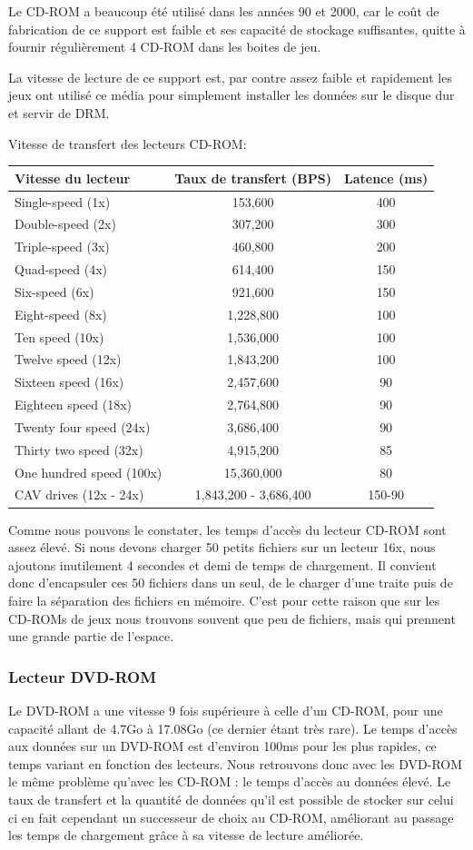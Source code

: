 \documentclass[a4paper, 11pt]{article} %
\begin{document}
Le CD-ROM a beaucoup été utilisé dans les années 90 et 2000, car le coût de fabrication de ce support est faible et ses capacité de stockage suffisantes, quitte à fournir régulièrement 4 CD-ROM dans les boites de jeu.

La vitesse de lecture de ce support est, par contre assez faible et rapidement les jeux ont utilisé ce média pour simplement installer les données sur le disque dur et servir de DRM.

\newpage
Vitesse de transfert des lecteurs CD-ROM: \cite{hardware:cdromspeed}

\begin{tabular}{|l|c|c|}
  \hline
  Vitesse du lecteur & Taux de transfert (BPS) & Latence (ms)\\
  \hline
  Single-speed (1x)&153,600&400\\
	Double-speed (2x)&307,200&300\\
	Triple-speed (3x)&460,800&200\\
	Quad-speed (4x)&614,400&150\\
	Six-speed (6x)&921,600&150\\
	Eight-speed (8x)&1,228,800&100\\
	Ten speed (10x)&1,536,000&100\\
	Twelve speed (12x)&1,843,200&100\\
	Sixteen speed (16x)&2,457,600&90\\
	Eighteen speed (18x)&2,764,800&90\\
	Twenty four speed (24x)&3,686,400&90\\
	Thirty two speed (32x)&4,915,200&85\\
	One hundred speed (100x)&15,360,000&80\\
	CAV drives (12x - 24x)&1,843,200 - 3,686,400&150-90\\
  \hline
\end{tabular}

Comme nous pouvons le constater, les temps d'accès du lecteur CD-ROM sont assez élevé. Si nous devons charger 50 petits fichiers sur un lecteur 16x, nous ajoutons inutilement 4 secondes et demi de temps de chargement. Il convient donc d'encapsuler ces 50 fichiers dans un seul, de le charger d'une traite puis de faire la séparation des fichiers en mémoire.
C'est pour cette raison que sur les CD-ROMs de jeux nous trouvons souvent que peu de fichiers, mais qui prennent une grande partie de l'espace.

\subsubsection{Lecteur DVD-ROM}
Le DVD-ROM a une vitesse 9 fois supérieure à celle d'un CD-ROM,\cite{hardware:dvdromspeed} pour une capacité allant de 4.7Go à 17.08Go (ce dernier étant très rare). Le temps d'accès aux données sur un DVD-ROM est d'environ 100ms pour les plus rapides, ce temps variant en fonction des lecteurs. Nous retrouvons donc avec les DVD-ROM le même problème qu'avec les CD-ROM : le temps d'accès au données élevé. Le taux de transfert et la quantité de données qu'il est possible de stocker sur celui ci en fait cependant un successeur de choix au CD-ROM, améliorant au passage les temps de chargement grâce à sa vitesse de lecture améliorée.
\end{document}

